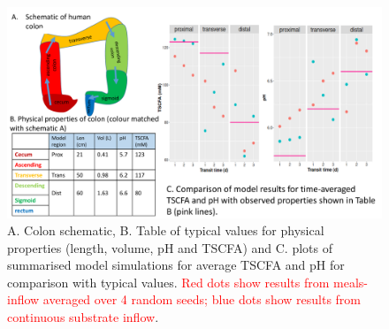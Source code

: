 \documentclass[a4paper]{article}
\begin{document}
\begin{figure}
    \centering
      \includegraphics[scale=0.35]{images/Fig1Schematic.pdf}
    \caption{A. Colon schematic, B. Table of typical values for physical properties (length, volume, pH and TSCFA) and C. plots of summarised model simulations for average TSCFA and pH for comparison with typical values. \textcolor{red}{Red dots show results from meals-inflow averaged over 4 random seeds; blue dots show results from continuous substrate inflow}. 
    }
    \label{fig:Validation}
\end{figure}
\end{document}

